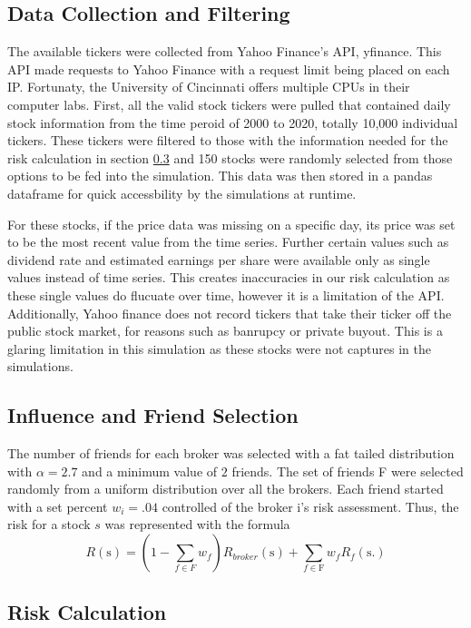 \documentclass[letterpaper, 10 pt, proceedings]{ieeetran}
\begin{document}
	\subsection{Data Collection and Filtering}\label{subsec:data}
	The available tickers were collected from Yahoo Finance's API, yfinance. This API made requests to Yahoo Finance with a request limit being placed on each IP. Fortunaty, the University of Cincinnati offers multiple CPUs in their computer labs. First, all the valid stock tickers were pulled that contained daily stock information from the time peroid of 2000 to 2020, totally 10,000 individual tickers. These tickers were filtered to those with the information needed for the risk calculation in section \ref{subsec:risk} and 150 stocks were randomly selected from those options to be fed into the simulation. This data was then stored in a pandas dataframe for quick accessbility by the simulations at runtime.\par
	For these stocks, if the price data was missing on a specific day, its price was set to be the most recent value from the time series. Further certain values such as dividend rate and estimated earnings per share were available only as single values instead of time series. This creates inaccuracies in our risk calculation as these single values do flucuate over time, however it is a limitation of the API. Additionally, Yahoo finance does not record tickers that take their ticker off the public stock market, for reasons such as banrupcy or private buyout. This is a glaring limitation in this simulation as these stocks were not captures in the simulations.  
	

	\subsection{Influence and Friend Selection}\label{subsec:friends}
	The number of friends for each broker was selected with a fat tailed distribution with $\alpha = 2.7$ and a minimum value of $2$ friends. The set of friends F were selected randomly from a uniform distribution over all the brokers. Each friend started with a set percent $w_i = .04$ controlled of the broker i's risk assessment. Thus, the risk for a stock $s$ was represented with the formula 
	$$R(\text{s}) = (1-\sum\limits_{f\in F} w_f) R_{broker}(\text{s}) + \sum\limits_{f\in \text{F}} w_f R_f(\text{s.})$$
	
	

	\subsection{Risk Calculation}\label{subsec:risk}
	
\end{document}
